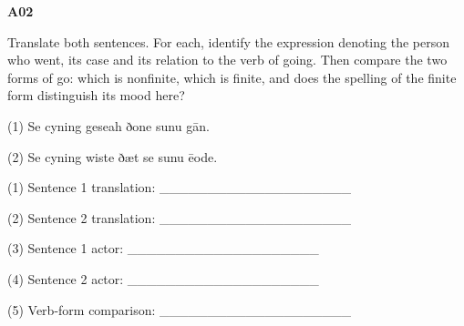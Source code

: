 \par\begin{minipage}{\linewidth}\raggedright
\textbf{A02}

Translate both sentences. For each, identify the expression denoting the person who went, its case and its relation to the verb of going. Then compare the two forms of go: which is nonfinite, which is finite, and does the spelling of the finite form distinguish its mood here?

(1) Se cyning geseah ðone sunu gān.

(2) Se cyning wiste ðæt se sunu ēode.

(1) Sentence 1 translation: \_\_\_\_\_\_\_\_\_\_\_\_\_\_\_\_\_\_\_\_

(2) Sentence 2 translation: \_\_\_\_\_\_\_\_\_\_\_\_\_\_\_\_\_\_\_\_

(3) Sentence 1 actor: \_\_\_\_\_\_\_\_\_\_\_\_\_\_\_\_\_\_\_\_

(4) Sentence 2 actor: \_\_\_\_\_\_\_\_\_\_\_\_\_\_\_\_\_\_\_\_

(5) Verb-form comparison: \_\_\_\_\_\_\_\_\_\_\_\_\_\_\_\_\_\_\_\_

\end{minipage}\par\addvspace{4pt}

